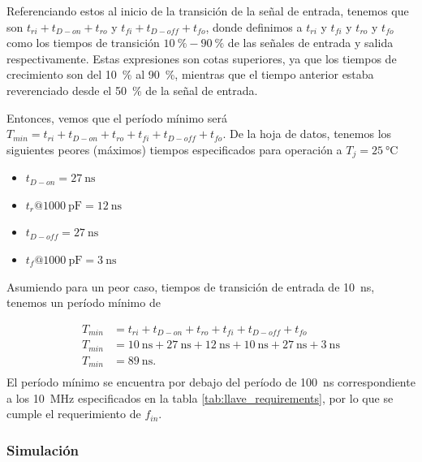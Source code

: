 Referenciando estos al inicio de la transición de la señal de entrada, tenemos
que son $t_{ri}+t_{D-on}+t_{ro}$ y $t_{fi}+t_{D-off}+t_{fo}$, donde definimos a
$t_{ri}$ y $t_{fi}$ y $t_{ro}$ y $t_{fo}$ como los tiempos de transición
$\qty{10}{\percent}-\qty{90}{\percent}$ de las señales de entrada y salida
respectivamente. Estas expresiones son cotas superiores, ya que los tiempos de
crecimiento son del \qty{10}{\percent} al \qty{90}{\percent}, mientras que el
tiempo anterior estaba reverenciado desde el \qty{50}{\percent} de la señal de
entrada.

Entonces, vemos que el período mínimo será $T_{min} = t_{ri} + t_{D-on} + t_{ro}
+ t_{fi} + t_{D-off} + t_{fo}$. De la hoja de datos, tenemos los siguientes
peores (máximos) tiempos especificados para operación a $T_j=\qty{25}{\celsius}$

\begin{itemize}
    \item $t_{D-on} = \qty{27}{\nano\second}$
    \item $t_{r} @ \qty{1000}{\pico\farad} = \qty{12}{\nano\second}$
    \item $t_{D-off} = \qty{27}{\nano\second}$
    \item $t_{f} @ \qty{1000}{\pico\farad} = \qty{3}{\nano\second}$
\end{itemize}

Asumiendo para un peor caso, tiempos de transición de entrada de
\qty{10}{\nano\second},  tenemos un período mínimo de

\begin{equation}
    \begin{aligned}
        T_{min} &= t_{ri} + t_{D-on} + t_{ro} + t_{fi} + t_{D-off} + t_{fo} \\
        T_{min} &= \qty{10}{\nano\second} + \qty{27}{\nano\second} +
        \qty{12}{\nano\second} + \qty{10}{\nano\second} + \qty{27}{\nano\second}
        + \qty{3}{\nano\second} \\
        T_{min} &= \qty{89}{\nano\second}. \\
    \end{aligned}
\end{equation}
El período mínimo se encuentra por debajo del período de \qty{100}{\nano\second}
correspondiente a los \qty{10}{\mega\hertz} especificados en
la tabla \ref{tab:llave_requirements}, por lo que se cumple el requerimiento de $f_{in}$.

\subsubsection{Simulación}

